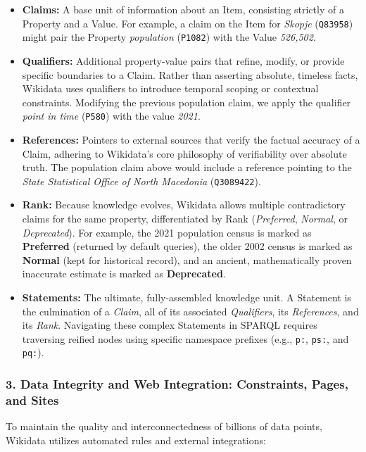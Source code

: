 \begin{itemize}
    \item \textbf{Claims:} A base unit of information about an Item, consisting strictly of a Property and a Value. For example, a claim on the Item for \textit{Skopje} (\texttt{Q83958}) might pair the Property \textit{population} (\texttt{P1082}) with the Value \textit{526,502}.
    
    \item \textbf{Qualifiers:} Additional property-value pairs that refine, modify, or provide specific boundaries to a Claim. Rather than asserting absolute, timeless facts, Wikidata uses qualifiers to introduce temporal scoping or contextual constraints. Modifying the previous population claim, we apply the qualifier \textit{point in time} (\texttt{P580}) with the value \textit{2021}.
    
    \item \textbf{References:} Pointers to external sources that verify the factual accuracy of a Claim, adhering to Wikidata's core philosophy of verifiability over absolute truth. The population claim above would include a reference pointing to the \textit{State Statistical Office of North Macedonia} (\texttt{Q3089422}).
    
    \item \textbf{Rank:} Because knowledge evolves, Wikidata allows multiple contradictory claims for the same property, differentiated by Rank (\textit{Preferred}, \textit{Normal}, or \textit{Deprecated}). For example, the 2021 population census is marked as \textbf{Preferred} (returned by default queries), the older 2002 census is marked as \textbf{Normal} (kept for historical record), and an ancient, mathematically proven inaccurate estimate is marked as \textbf{Deprecated}.
    
    \item \textbf{Statements:} The ultimate, fully-assembled knowledge unit. A Statement is the culmination of a \textit{Claim}, all of its associated \textit{Qualifiers}, its \textit{References}, and its \textit{Rank}. Navigating these complex Statements in SPARQL requires traversing reified nodes using specific namespace prefixes (e.g., \texttt{p:}, \texttt{ps:}, and \texttt{pq:}).
\end{itemize}

\subsubsection*{3. Data Integrity and Web Integration: Constraints, Pages, and Sites}
To maintain the quality and interconnectedness of billions of data points, Wikidata utilizes automated rules and external integrations:

